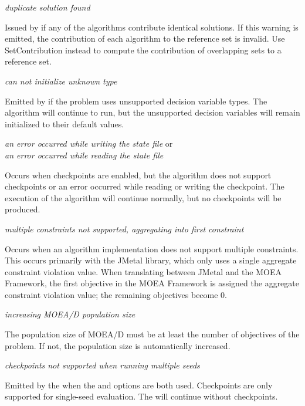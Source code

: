 \noindent
\textit{duplicate solution found}
\begin{indented}
  Issued by  if any of the algorithms contribute identical solutions.  If this warning is emitted, the contribution of each algorithm to the reference set is invalid.  Use SetContribution instead to compute the contribution of overlapping sets to a reference set.
\end{indented}
  
\noindent
\textit{can not initialize unknown type}
\begin{indented}
  Emitted by  if the problem uses unsupported decision variable types.  The algorithm will continue to run, but the unsupported decision variables will remain initialized to their default values.
\end{indented}

\noindent
\textit{an error occurred while writing the state file} or\\
\textit{an error occurred while reading the state file}
\begin{indented}
  Occurs when checkpoints are enabled, but the algorithm does not support checkpoints or an error occurred while reading or writing the checkpoint.  The execution of the algorithm will continue normally, but no checkpoints will be produced.
\end{indented}
  
\noindent
\textit{multiple constraints not supported, aggregating into first constraint}
\begin{indented}
  Occurs when an algorithm implementation does not support multiple constraints. This occurs primarily with the JMetal library, which only uses a single aggregate constraint violation value.  When translating between JMetal and the MOEA Framework, the first objective in the MOEA Framework is assigned the aggregate constraint violation value; the remaining objectives become 0.
\end{indented}

\noindent
\textit{increasing MOEA/D population size}
\begin{indented}
  The population size of MOEA/D must be at least the number of objectives of the problem.  If not, the population size is automatically increased.
\end{indented}
  
\noindent
\textit{checkpoints not supported when running multiple seeds}
\begin{indented}
  Emitted by the  when the  and  options are both used.  Checkpoints are only supported for single-seed evaluation.  The  will continue without checkpoints.
\end{indented}
  
